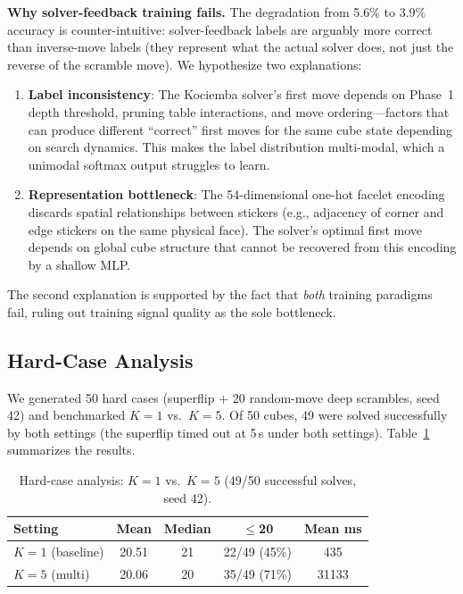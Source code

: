 \documentclass[10pt,twocolumn,a4paper]{article}
\begin{document}
\textbf{Why solver-feedback training fails.} The degradation from 5.6\% to 3.9\% accuracy is counter-intuitive: solver-feedback labels are arguably more correct than inverse-move labels (they represent what the actual solver does, not just the reverse of the scramble move). We hypothesize two explanations:

\begin{enumerate}[leftmargin=*]
  \item \textbf{Label inconsistency}: The Kociemba solver's first move depends on Phase~1 depth threshold, pruning table interactions, and move ordering---factors that can produce different ``correct'' first moves for the same cube state depending on search dynamics. This makes the label distribution multi-modal, which a unimodal softmax output struggles to learn.
  
  \item \textbf{Representation bottleneck}: The 54-dimensional one-hot facelet encoding discards spatial relationships between stickers (e.g., adjacency of corner and edge stickers on the same physical face). The solver's optimal first move depends on global cube structure that cannot be recovered from this encoding by a shallow MLP.
\end{enumerate}

The second explanation is supported by the fact that \emph{both} training paradigms fail, ruling out training signal quality as the sole bottleneck.

\subsection{Hard-Case Analysis}
\label{sec:hard-cases}

We generated 50 hard cases (superflip + 20 random-move deep scrambles, seed 42) and benchmarked $K{=}1$ vs.\ $K{=}5$. Of 50 cubes, 49 were solved successfully by both settings (the superflip timed out at 5\,s under both settings). Table~\ref{tab:hard} summarizes the results.

\begin{table}[t]
\centering
\caption{Hard-case analysis: $K{=}1$ vs.\ $K{=}5$ (49/50 successful solves, seed 42).}
\label{tab:hard}
\begin{tabular}{@{}lcccc@{}}
\toprule
\textbf{Setting} & \textbf{Mean} & \textbf{Median} & \textbf{$\leq$20} & \textbf{Mean ms} \\
\midrule
$K{=}1$ (baseline) & 20.51 & 21 & 22/49 (45\%) & 435 \\
$K{=}5$ (multi)    & 20.06 & 20 & 35/49 (71\%) & 31133 \\
\bottomrule
\end{tabular}
\end{table}
\end{document}
